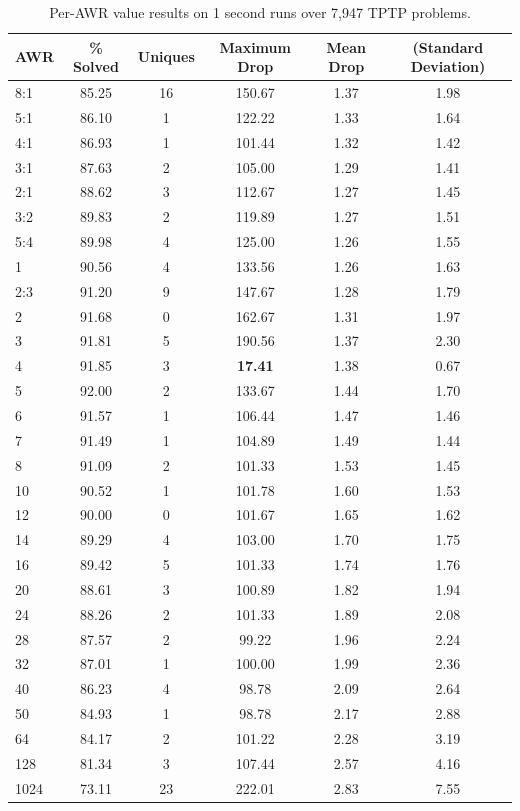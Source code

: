\documentclass{llncs}
\begin{document}
\begin{table}[t]
	\caption{
Per-AWR value results on 1 second runs over 7,947 TPTP problems.
	}
	\centering
	\begin{tabular}{l | c | c | c | c  c }
		AWR & \% Solved & Uniques & Maximum Drop & Mean Drop & (Standard Deviation)\\
\hline
8:1 & 85.25 & 16 & 150.67 & 1.37 & 1.98\\
5:1 & 86.10 & 1 & 122.22 & 1.33 & 1.64\\
4:1 & 86.93 & 1 & 101.44 & 1.32 & 1.42\\
3:1 & 87.63 & 2 & 105.00 & 1.29 & 1.41\\
2:1 & 88.62 & 3 & 112.67 & 1.27 & 1.45\\
3:2 & 89.83 & 2 & 119.89 & 1.27 & 1.51\\
5:4 & 89.98 & 4 & 125.00 & 1.26 & 1.55\\
1   & 90.56 & 4 & 133.56 & 1.26 & 1.63\\
2:3 & 91.20 & 9 & 147.67 & 1.28 & 1.79\\
2   & 91.68 & 0 & 162.67 & 1.31 & 1.97\\
3   & 91.81 & 5 & 190.56 & 1.37 & 2.30\\
4   & 91.85 & 3 & \textbf{17.41} & 1.38 & 0.67\\
5   & 92.00 & 2 & 133.67 & 1.44 & 1.70\\
6   & 91.57 & 1 & 106.44 & 1.47 & 1.46\\
7   & 91.49 & 1 & 104.89 & 1.49 & 1.44\\
8   & 91.09 & 2 & 101.33 & 1.53 & 1.45\\
10  & 90.52 & 1 & 101.78 & 1.60 & 1.53\\
12  & 90.00 & 0 & 101.67 & 1.65 & 1.62\\
14  & 89.29 & 4 & 103.00 & 1.70 & 1.75\\
16  & 89.42 & 5 & 101.33 & 1.74 & 1.76\\
20  & 88.61 & 3 & 100.89 & 1.82 & 1.94\\
24  & 88.26 & 2 & 101.33 & 1.89 & 2.08\\
28  & 87.57 & 2 & 99.22 & 1.96 & 2.24\\
32  & 87.01 & 1 & 100.00 & 1.99 & 2.36\\
40  & 86.23 & 4 & 98.78 & 2.09 & 2.64\\
50  & 84.93 & 1 & 98.78 & 2.17 & 2.88\\
64  & 84.17 & 2 & 101.22 & 2.28 & 3.19\\
128 & 81.34 & 3 & 107.44 & 2.57 & 4.16\\
1024 & 73.11 & 23 & 222.01 & 2.83 & 7.55
	\end{tabular}
	\label{tab:no-best-awr}
\end{table}
\end{document}
